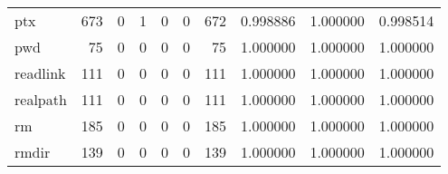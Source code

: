 \begin{longtable}{lrrrrrrrrr}
ptx       &                                   673 &                                                  0 &                                                  1 &                                                  0 &                                                  0 &                                                672 &                                           0.998886 &                               1.000000 &                             0.998514 \\
pwd       &                                    75 &                                                  0 &                                                  0 &                                                  0 &                                                  0 &                                                 75 &                                           1.000000 &                               1.000000 &                             1.000000 \\
readlink  &                                   111 &                                                  0 &                                                  0 &                                                  0 &                                                  0 &                                                111 &                                           1.000000 &                               1.000000 &                             1.000000 \\
realpath  &                                   111 &                                                  0 &                                                  0 &                                                  0 &                                                  0 &                                                111 &                                           1.000000 &                               1.000000 &                             1.000000 \\
rm        &                                   185 &                                                  0 &                                                  0 &                                                  0 &                                                  0 &                                                185 &                                           1.000000 &                               1.000000 &                             1.000000 \\
rmdir     &                                   139 &                                                  0 &                                                  0 &                                                  0 &                                                  0 &                                                139 &                                           1.000000 &                               1.000000 &                             1.000000 \\

\end{longtable}
